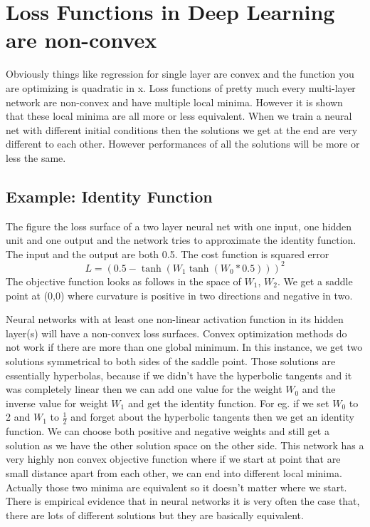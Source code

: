 \chapter{Loss Functions in Deep Learning are non-convex}\label{chp:Loss Functions in Deep Learning are non-convex}

Obviously things like regression for single layer are convex and the function you are optimizing is quadratic in x. Loss functions of pretty much every multi-layer network are non-convex and have multiple local minima. However it is shown that these local minima are all more or less equivalent. When we train a neural net with different initial conditions then the solutions we get at the end are very different to each other. However performances of all the solutions will be more or less the same. 

\section{Example: Identity Function}
The figure the loss surface of a two layer neural net with one input, one hidden unit and one output and the network tries to approximate the identity function. The input and the output are both 0.5. The cost function is squared error 
\begin{equation}
    L = (0.5 - \tanh (W_1 \tanh (W_0 * 0.5)))^2
\end{equation}
The objective function looks as follows in the space of $W_1$, $W_2$. We get a saddle point at (0,0) where curvature is positive in two directions and negative in two. 

Neural networks with at least one non-linear activation function in its hidden layer(s) will have a non-convex loss surfaces. Convex optimization methods do not work if there are more than one global minimum. In this instance, we get two solutions symmetrical to both sides of the saddle point. Those solutions are essentially hyperbolas, because if we didn't have the hyperbolic tangents and it was completely linear then we can add one value for the weight $W_0$ and the inverse value for weight $W_1$ and get the identity function. For eg. if we set $W_0$ to 2 and $W_1$ to $\frac{1}{2}$ and forget about the hyperbolic tangents then we get an identity function. We can choose both positive and negative weights and still get a solution as we have the other solution space on the other side. This network has a very highly non convex objective function where if we start at point that are small distance apart from each other, we can end into different local minima. Actually those two minima are equivalent so it doesn’t matter where we start. There is empirical evidence that in neural networks it is very often the case that, there are lots of different solutions but they are basically equivalent. 

